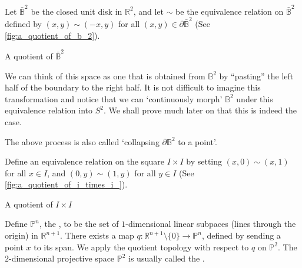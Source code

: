 \documentclass[notoc,notitlepage]{tufte-book}
\begin{document}
\begin{eg}
  Let $\bar{\mathbb{B}}^2$ be the closed unit disk in $\mathbb{R}^2$, and let $\sim$ be the
  equivalence relation on $\bar{\mathbb{B}}^2$ defined by $(x, y) \sim (-x, y)$ for all $(x, y)
  \in \partial \bar{\mathbb{B}}^2$ (See \cref{fig:a_quotient_of_b_2}).
  \begin{marginfigure}
    \centering
    \caption{A quotient of $\bar{\mathbb{B}}^2$}\label{fig:a_quotient_of_b_2}
  \end{marginfigure}
  We can think of this space as one that is obtained from $\mathbb{B}^2$ by ``pasting'' the
  left half of the boundary to the right half. It is not difficult to imagine this transformation
  and notice that we can `continuously morph' $\mathbb{B}^2$ under this equivalence relation into
  $S^2$. We shall prove much later on that this is indeed the case.

  The above process is also called `collapsing $\partial \mathbb{B}^2$ to a point'.
\end{eg}

\begin{eg}
  Define an equivalence relation on the square $I \times I$ by setting $(x, 0) \sim (x, 1)$ for
  all $x \in I$, and $(0, y) \sim (1, y)$ for all $y \in I$ (See 
  \cref{fig:a_quotient_of_i_times_i_}).
  \begin{marginfigure}
    \centering
    \caption{A quotient of $I \times I$}\label{fig:a_quotient_of_i_times_i_}
  \end{marginfigure}
\end{eg}

\begin{eg}
  Define $\mathbb{P}^n$, the , to be the set of
  $1$-dimensional linear subpaces (lines through the origin) in $\mathbb{R}^{n + 1}$. There
  exists a map $q : \mathbb{R}^{n + 1} \setminus \{ 0 \} \to \mathbb{P}^n$, defined by sending
  a point $x$ to its span. We apply the quotient topology with respect to $q$ on $\mathbb{P}^2$.
  The $2$-dimensional projective space $\mathbb{P}^2$ is usually called the .
\end{eg}
\end{document}
